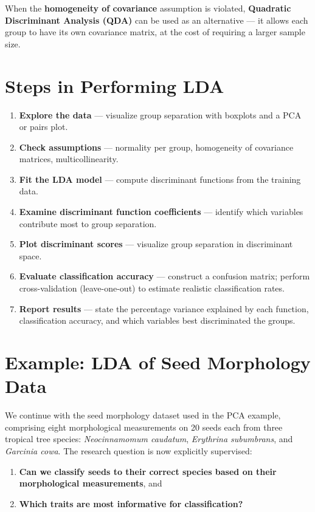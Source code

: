 \documentclass[
]{book}
\providecommand{\tightlist}{%
  \setlength{\itemsep}{0pt}\setlength{\parskip}{0pt}}
\begin{document}
When the \textbf{homogeneity of covariance} assumption is violated, \textbf{Quadratic Discriminant Analysis (QDA)} can be used as an alternative --- it allows each group to have its own covariance matrix, at the cost of requiring a larger sample size.

\section{Steps in Performing LDA}\label{steps-in-performing-lda}

\begin{enumerate}
\def\labelenumi{\arabic{enumi}.}
\tightlist
\item
  \textbf{Explore the data} --- visualize group separation with boxplots and a PCA or pairs plot.
\item
  \textbf{Check assumptions} --- normality per group, homogeneity of covariance matrices, multicollinearity.
\item
  \textbf{Fit the LDA model} --- compute discriminant functions from the training data.
\item
  \textbf{Examine discriminant function coefficients} --- identify which variables contribute most to group separation.
\item
  \textbf{Plot discriminant scores} --- visualize group separation in discriminant space.
\item
  \textbf{Evaluate classification accuracy} --- construct a confusion matrix; perform cross-validation (leave-one-out) to estimate realistic classification rates.
\item
  \textbf{Report results} --- state the percentage variance explained by each function, classification accuracy, and which variables best discriminated the groups.
\end{enumerate}

\section{Example: LDA of Seed Morphology Data}\label{example-lda-of-seed-morphology-data}

We continue with the seed morphology dataset used in the PCA example, comprising eight morphological measurements on 20 seeds each from three tropical tree species: \emph{Neocinnamomum caudatum}, \emph{Erythrina subumbrans}, and \emph{Garcinia cowa}. The research question is now explicitly supervised:

\begin{enumerate}
\def\labelenumi{\arabic{enumi}.}
\tightlist
\item
  \textbf{Can we classify seeds to their correct species based on their morphological measurements}, and
\item
  \textbf{Which traits are most informative for classification?}
\end{enumerate}
\end{document}
